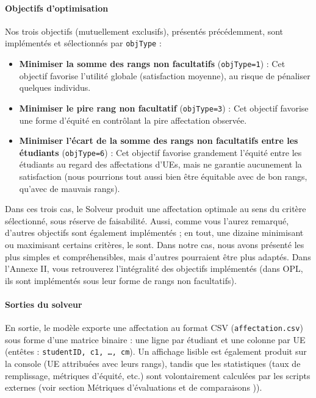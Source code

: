 \documentclass{rapport}
\theoremstyle{definition}
\theoremstyle{remark}
\theoremstyle{plain}
\theoremstyle{definition}
\theoremstyle{definition}
\theoremstyle{remark}
\theoremstyle{definition}
\begin{document}
\paragraph{Objectifs d'optimisation}
Nos trois objectifs (mutuellement exclusifs), présentés précédemment, sont implémentés et sélectionnés par \texttt{objType} :
\begin{itemize}
    \item \textbf{Minimiser la somme des rangs non facultatifs} (\texttt{objType=1}) : Cet objectif favorise l'utilité globale (satisfaction moyenne), au risque de pénaliser quelques individus.
    \item \textbf{Minimiser le pire rang non facultatif} (\texttt{objType=3}) : Cet objectif favorise une forme d'équité en contrôlant la pire affectation observée.
    \item \textbf{Minimiser l'écart de la somme des rangs non facultatifs entre les étudiants} (\texttt{objType=6}) : Cet objectif favorise grandement l'équité entre les étudiants au regard des affectations d'UEs, mais ne garantie aucunement la satisfaction (nous pourrions tout aussi bien être équitable avec de bon rangs, qu'avec de mauvais rangs).
\end{itemize}

Dans ces trois cas, le Solveur produit une affectation optimale au sens du critère sélectionné, sous réserve de faisabilité.
Aussi, comme vous l'aurez remarqué, d'autres objectifs sont également implémentés ; en tout, une dizaine minimisant ou maximisant certains critères, le sont. Dans notre cas, nous avons présenté les plus simples et compréhensibles, mais d'autres pourraient être plus adaptés. Dans l'Annexe II, vous retrouverez l'intégralité des objectifs implémentés (dans OPL, ils sont implémentés sous leur forme de rangs non facultatifs).

\paragraph{Sorties du solveur}
En sortie, le modèle exporte une affectation au format CSV (\texttt{affectation.csv}) sous forme d'une matrice binaire : une ligne par étudiant et une colonne par UE (entêtes : \texttt{studentID, c1, \ldots, cm}). Un affichage lisible est également produit sur la console (UE attribuées avec leurs rangs), tandis que les statistiques (taux de remplissage, métriques d'équité, etc.) sont volontairement calculées par les scripts externes (voir section \og Métriques d'évaluations et de comparaisons \fg{})).
\end{document}
